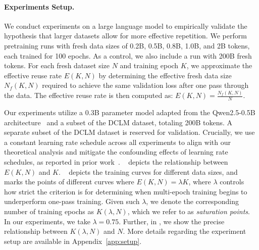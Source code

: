 
\paragraph{Experiments Setup.} We conduct experiments on a large language model to empirically validate the hypothesis that larger datasets allow for more effective repetition. We perform pretraining runs with fresh data sizes of 0.2B, 0.5B, 0.8B, 1.0B, and 2B tokens, each trained for 100 epochs. As a control, we also include a run with 200B fresh tokens. For each fresh dataset size $N$ and training epoch $K$, we approximate the effective reuse rate $E(K,N)$ by determining the effective fresh data size $N_f(K,N)$ required to achieve the same validation loss after one pass through the data. The effective reuse rate is then computed as: $E(K,N)=\frac{N_f(K,N)}{N}$.

Our experiments utilize a 0.3B parameter model adapted from the Qwen2.5-0.5B architecture~\citep{qwen2025qwen25technicalreport} and a subset of the DCLM dataset, totaling 200B tokens.
A separate subset of the DCLM dataset is reserved for validation. Crucially, we use a constant learning rate schedule across all experiments to align with our theoretical analysis and mitigate the confounding effects of learning rate schedules, as reported in prior work~\citep{hoffmann2022training,luo2025multi}. ~ depicts the relationship between $E(K,N)$ and $K$. ~ depicts the training curves for different data sizes, and marks the points of different curves where $E(K,N)=\lambda K$, where $\lambda$ controls how strict the criterion is for determining when multi-epoch training begins to underperform one-pass training. Given such $\lambda$, we denote the corresponding number of training epochs as $K(\lambda, N)$, which we refer to as \textit{saturation points}. In our experiments, we take $\lambda = 0.75$. Further, in , we show the precise relationship between $K(\lambda, N)$ and $N$. More details regarding the experiment setup are available in Appendix~\ref{app:setup}.


